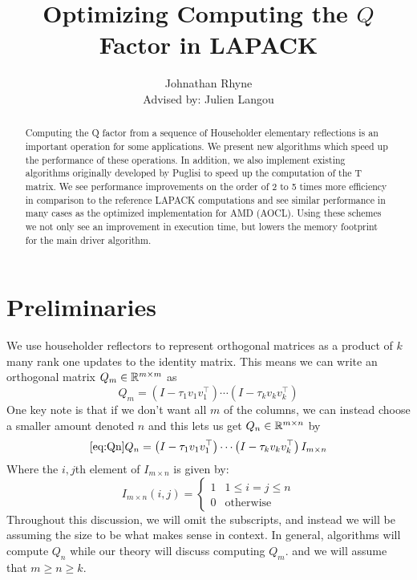 \documentclass[12pt]{article}
\title{Optimizing Computing the $Q$ Factor in LAPACK}
\author{Johnathan Rhyne\\ Advised by: Julien Langou}
\begin{document}
    \maketitle
    \begin{abstract}
    Computing the Q factor from a sequence of Householder elementary reflections is an important operation for some 
    applications. We present new algorithms which speed up the performance of these operations. In addition, we also 
    implement existing algorithms originally developed by Puglisi to speed up the computation of the T matrix. We see 
    performance improvements on the order of 2 to 5 times more efficiency in comparison to the reference LAPACK 
    computations and see similar performance in many cases as the optimized implementation for AMD (AOCL). Using these 
    schemes we not only see an improvement in execution time, but lowers the memory footprint for the main driver 
    algorithm.
    \end{abstract}
    \section{Preliminaries}
    We use householder reflectors to represent orthogonal matrices as a product of $k$ many rank one updates to the identity matrix. This means we can write an orthogonal matrix $Q_m\in\mathbb{R}^{m\times m}$ as 
    \begin{equation}\label{eq:Q}
        Q_m = \left(I - \tau_1 v_1v_1^\top\right)\cdots\left(I - \tau_kv_kv_k^\top\right)
    \end{equation}
    One key note is that if we don't want all $m$ of the columns, we can instead choose a smaller amount denoted $n$ 
    and this lets us get $Q_n\in\mathbb{R}^{m\times n}$ by 
    \begin{equation}\ref{eq:Qn}
        Q_n = \left(I - \tau_1 v_1v_1^\top\right)\cdots\left(I - \tau_kv_kv_k^\top\right)I_{m\times n}
    \end{equation}
    Where the $i,j$th element of $I_{m\times n}$ is given by:
    \begin{equation*}
        I_{m\times n}(i,j) = \begin{cases}
            1 & 1\leq i = j\leq n\\
            0 & \text{otherwise}
        \end{cases}
    \end{equation*}
    Throughout this discussion, we will omit the subscripts, and instead we will be assuming the size to be 
    what makes sense in context. In general, algorithms will compute $Q_n$ while our theory will discuss computing $Q_m$. 
    and we will assume that $m\geq n\geq k$.
\end{document}
